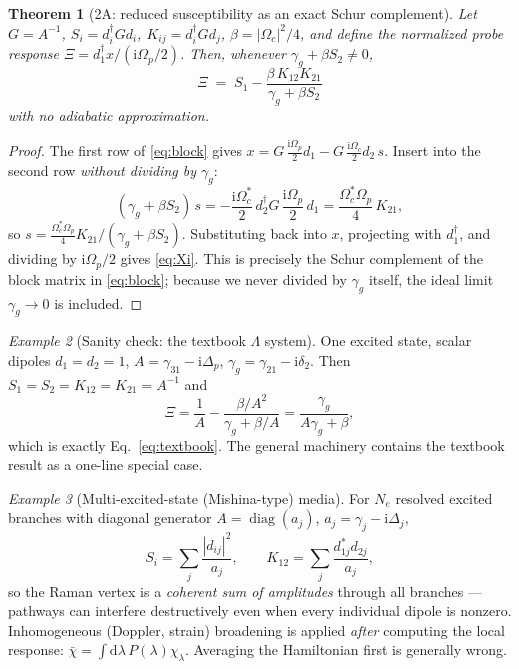 \documentclass[11pt,a4paper]{article}
\newtheorem{theorem}{Theorem}[section]
\theoremstyle{remark}
\newtheorem{example}[theorem]{Example}
\newcommand{\dd}{\mathrm{d}}
\newcommand{\im}{\mathrm{i}}
\begin{document}
\begin{theorem}[2A: reduced susceptibility as an exact Schur complement]
\label{thm:2A}
Let $G=A^{-1}$, $S_i=d_i^\dagger G d_i$, $K_{ij}=d_i^\dagger G d_j$,
$\beta=|\Omega_c|^2/4$, and define the normalized probe response
$\Xi=d_1^\dagger x/(\im\Omega_p/2)$. Then, whenever
$\gamma_g+\beta S_2\neq0$,
\begin{equation}
\boxed{\;\Xi \;=\; S_1-\frac{\beta\,K_{12}K_{21}}{\gamma_g+\beta S_2}\;}
\label{eq:Xi}
\end{equation}
with no adiabatic approximation.
\end{theorem}

\begin{proof}
The first row of \eqref{eq:block} gives
$x=G\,\tfrac{\im\Omega_p}{2}d_1-G\,\tfrac{\im\Omega_c}{2}d_2\,s$.
Insert into the second row \emph{without dividing by $\gamma_g$}:
\[
(\gamma_g+\beta S_2)\,s
 = -\frac{\im\Omega_c^*}{2}\,d_2^\dagger G\,\frac{\im\Omega_p}{2}\,d_1
 = \frac{\Omega_c^*\Omega_p}{4}\,K_{21},
\]
so $s=\tfrac{\Omega_c^*\Omega_p}{4}K_{21}/(\gamma_g+\beta S_2)$. Substituting
back into $x$, projecting with $d_1^\dagger$, and dividing by $\im\Omega_p/2$
gives \eqref{eq:Xi}. This is precisely the Schur complement of the block matrix
in \eqref{eq:block}; because we never divided by $\gamma_g$ itself, the ideal
limit $\gamma_g\to0$ is included.
\end{proof}

\begin{example}[Sanity check: the textbook $\Lambda$ system]
\label{ex:textbook}
One excited state, scalar dipoles $d_1=d_2=1$, $A=\gamma_{31}-\im\Delta_p$,
$\gamma_g=\gamma_{21}-\im\delta_2$. Then $S_1=S_2=K_{12}=K_{21}=A^{-1}$ and
\[
\Xi=\frac1A-\frac{\beta/A^2}{\gamma_g+\beta/A}
   =\frac{\gamma_g}{A\gamma_g+\beta},
\]
which is exactly Eq.~\eqref{eq:textbook}. The general machinery contains the
textbook result as a one-line special case.
\end{example}

\begin{example}[Multi-excited-state (Mishina-type) media]
For $N_e$ resolved excited branches with diagonal generator
$A=\operatorname{diag}(a_j)$, $a_j=\gamma_j-\im\Delta_j$,
\[
S_i=\sum_j\frac{|d_{ij}|^2}{a_j},
\qquad
K_{12}=\sum_j\frac{d_{1j}^*d_{2j}}{a_j},
\]
so the Raman vertex is a \emph{coherent sum of amplitudes} through all
branches --- pathways can interfere destructively even when every individual
dipole is nonzero. Inhomogeneous (Doppler, strain) broadening is applied
\emph{after} computing the local response:
$\bar\chi=\int\dd\lambda\,P(\lambda)\chi_\lambda$. Averaging the Hamiltonian
first is generally wrong.
\end{example}
\end{document}
